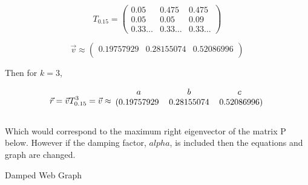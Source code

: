 \documentclass[12pt]{article}
\begin{document}
$$
T_{0.15}
=
\begin{pmatrix} 
  0.05 	& 0.475 	& 0.475 \\
  0.05 	& 0.05 	& 0.09 \\
  0.33 \dots 	&  0.33 \dots 	&  0.33 \dots
\end{pmatrix}
$$


\begin{equation}
\nonumber \vec{v} \approx
\begin{pmatrix}
   0.19757929 &  0.28155074 & 0.52086996 \\
\end{pmatrix}
\end{equation}

Then for $k=3$,

$$
\vec{r} = \vec{v} T_{0.15}^3 = \vec{v} \approx 
%
\begin{blockarray}{ccc}
a & b & c \\
\begin{block}{(ccc)}
  0.19757929 &  0.28155074 & 0.52086996\\
\end{block}
\end{blockarray}
$$

\iffalse

Which would correspond to the maximum right eigenvector of the matrix P below. However if the damping factor, $alpha$, is included then the equations and graph are changed.

\begin{center} Damped Web Graph \end{center}
\end{document}
